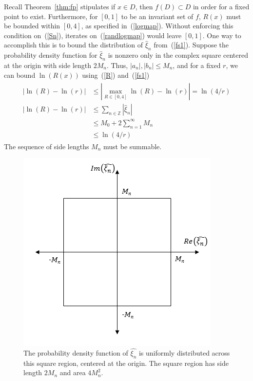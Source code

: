 Recall Theorem~\ref{thm:fp} stipulates if $x \in D$, then $f(D) \subset
D$ in order for a fixed point to exist. Furthermore, for $[0,1]$ to be an invariant set of $f$, $R(x)$
must be bounded within $[0,4]$, as specified in~(\ref{logmap}). Without enforcing this condition
on~(\ref{Sn}), iterates on~(\ref{randlogmap}) would leave $[0,1]$. One way to accomplish this is to bound
the distribution of $\hat{\xi}_n$ from~(\ref{fs1}). Suppose the probability density
function for $\hat{\xi}_n$ is nonzero only in the complex square centered at the
origin with side length $2M_n$. Thus, $|a_n|,|b_n| \leq M_n$, and for a fixed $r$, we
can bound $\ln(R(x))$ using~(\ref{R}) and~(\ref{fs1})
\begin{align}
\begin{split}\label{bdnr}
|\ln(R)-\ln(r)|&\leq |\max_{R\in [0,4]}\ln(R) - \ln(r)|=\ln(4/r)\\
|\ln(R)-\ln(r)|&\leq \sum_{n\in \mathbb{Z}}|\hat{\xi}_n| \\
&\leq M_0+2\sum_{n=1}^\infty M_n\\
&\leq \ln(4/r)
\end{split}
\end{align}
The sequence of side lengths $M_n$ must be summable. 
\begin{figure}[!h]
\caption[Uniform Distribution over a Square Region]{The probability
  density function of $\hat{\xi_n}$ is uniformly distributed across
  this square region, centered at the origin. The square region has
  side length $2M_n$ and area $4M_n^2$.}\label{fig:square}
	\begin{center}
		\includegraphics[scale=0.7]{figs/square.png}
	\end{center}
\end{figure}
